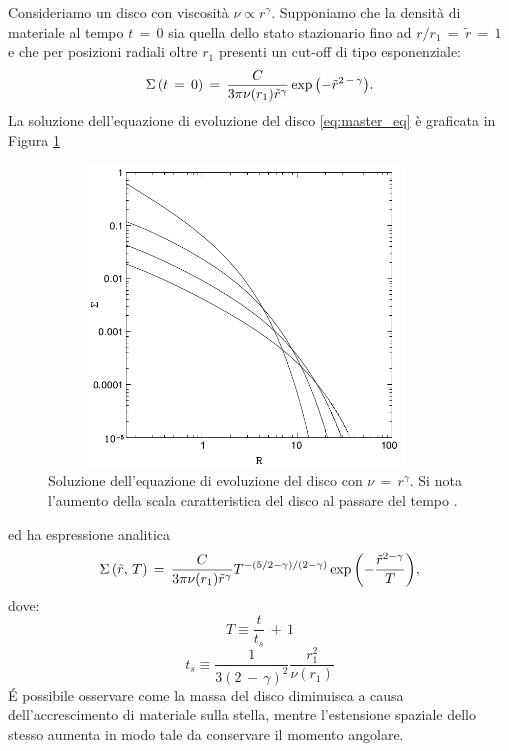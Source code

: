 Consideriamo un disco con viscosità $\nu \propto r^{\gamma}$. Supponiamo che la densità di materiale al tempo $t\,=\,0$ sia quella dello stato stazionario fino ad $r/r_1\,=\,\tilde{r}\,=\,1$ e che per posizioni radiali oltre $r_1$ presenti un cut-off di tipo esponenziale:
\begin{equation}
\Sigma\left(t\,=\,0\right)\,=\,\frac{C}{3\pi \nu(r_1)\tilde{r}^{\gamma}}\exp{\left(-\Tilde{r}^{2\,-\,\gamma}\right)}.
\label{eq:condin_sss}
\end{equation}
La soluzione dell'equazione di evoluzione del disco \eqref{eq:master_eq} è graficata in Figura \ref{fig:Self_Similar}
\begin{figure}[H]
    \centering
    \includegraphics[height=8cm, width=10.5cm]{Immagini/IntroTeorica/SelfSimilarSolution.png}
    \caption{Soluzione dell'equazione di evoluzione del disco con $\nu\,=\,r^\gamma$. Si nota l'aumento della scala caratteristica del disco al passare del tempo \parencite{Lodato2008}.}
    \label{fig:Self_Similar}
\end{figure}
ed ha espressione analitica
\begin{equation}
\Sigma\left(\Tilde{r},\,T\right)\,=\,\frac{C}{3\pi\nu(r_1)\tilde{r}^\gamma}T^{-(5/2-\gamma)/(2-\gamma)}\exp{\left(-\frac{\Tilde{r}^{2-\gamma}}{T}\right)}, 
\label{eq:sol_sss}
\end{equation}
dove:
\begin{equation}
T \equiv \frac{t}{t_s}\,+\,1
\label{eq:T_sss}
\end{equation}
\begin{equation}
t_s \equiv \frac{1}{3\left(2\,-\,\gamma\right)^2} \frac{r_1^2}{\nu(r_1)}
\label{eq:ts_sss}
\end{equation}
\'E possibile osservare come la massa del disco diminuisca a causa dell'accrescimento di materiale sulla stella, mentre l'estensione spaziale dello stesso aumenta in modo tale da conservare il momento angolare.